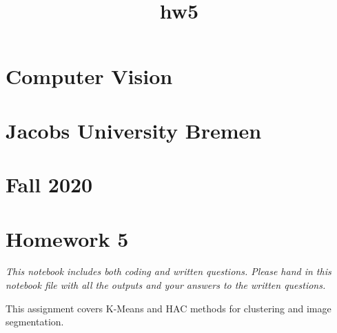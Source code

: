 \documentclass[11pt]{article}
\title{hw5}
\begin{document}
    
    \maketitle
    
    

    
    \hypertarget{computer-vision}{%
\section{Computer Vision}\label{computer-vision}}

\hypertarget{jacobs-university-bremen}{%
\section{Jacobs University Bremen}\label{jacobs-university-bremen}}

\hypertarget{fall-2020}{%
\section{Fall 2020}\label{fall-2020}}

\hypertarget{homework-5}{%
\section{Homework 5}\label{homework-5}}

\emph{This notebook includes both coding and written questions. Please
hand in this notebook file with all the outputs and your answers to the
written questions.}

This assignment covers K-Means and HAC methods for clustering and image
segmentation.
\end{document}
